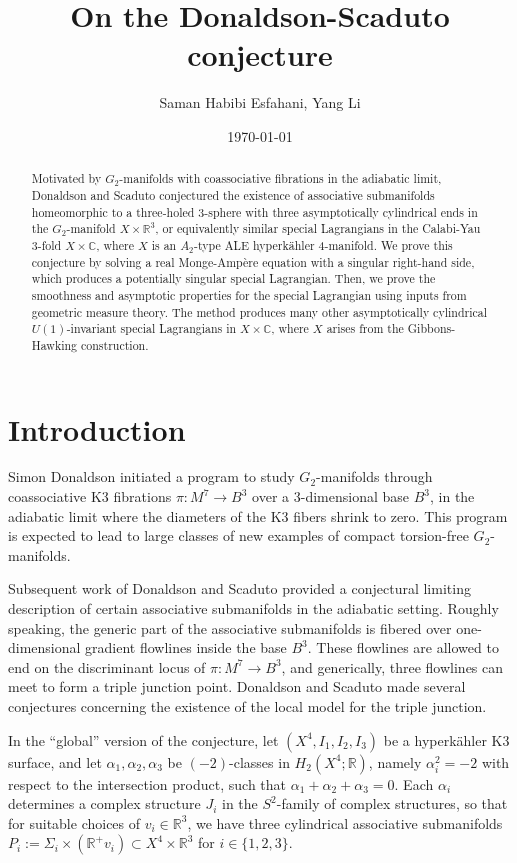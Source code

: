 \documentclass[11pt]{article}
\title{On the Donaldson-Scaduto conjecture}
\author{Saman Habibi Esfahani, Yang Li}
\date{\today}
\begin{document}
\maketitle

\begin{abstract}
Motivated by $G_2$-manifolds with coassociative fibrations in the adiabatic limit, Donaldson and Scaduto conjectured the existence of associative submanifolds homeomorphic to a three-holed $3$-sphere with three asymptotically cylindrical ends in the $G_2$-manifold $X \times \mathbb{R}^3$, or equivalently similar special Lagrangians in the Calabi-Yau 3-fold $X \times \mathbb{C}$, where $X$ is an $A_2$-type ALE hyperkähler 4-manifold. We prove this conjecture by solving a real Monge-Amp\`ere equation with a singular right-hand side, which produces a potentially singular special Lagrangian. Then, we prove the smoothness and asymptotic properties for the special Lagrangian using inputs from geometric measure theory. 
The method produces many other asymptotically cylindrical $U(1)$-invariant special Lagrangians in $X\times \mathbb{C}$, where $X$ arises from the Gibbons-Hawking construction.
\end{abstract}

\section{Introduction}

Simon Donaldson \cite{MR3702382} initiated a program to study $G_2$-manifolds through coassociative K3 fibrations $\pi:M^7\to B^3$ over a 3-dimensional base $B^3$, in the adiabatic limit where the diameters of the K3 fibers shrink to zero. This program is expected to lead to large classes of new examples of compact torsion-free $G_2$-manifolds. 

Subsequent work of Donaldson and Scaduto \cite{MR4479718}  provided a conjectural limiting description of certain associative submanifolds in the adiabatic setting. Roughly speaking, the generic part of the associative submanifolds is fibered over one-dimensional gradient flowlines inside the base $B^3$. These flowlines are allowed to end on the discriminant locus of $\pi: M^7\to B^3$, and generically, three flowlines can meet to form a triple junction point. Donaldson and Scaduto made several conjectures concerning the existence of the local model for the triple junction.

In the ``global'' version of the conjecture, let $(X^4, I_1, I_2, I_3)$ be a hyperkähler K3 surface, and let $\alpha_1, \alpha_2,\alpha_3$ be $(-2)$-classes in $H_2(X^4; \mathbb{R})$, namely $\alpha_i^2 = -2$ with respect to the intersection product, such that $\alpha_1 + \alpha_2 + \alpha_3 = 0$. Each $\alpha_i$ determines a complex structure $J_i$ in the $S^2$-family of complex structures, so that for suitable choices of $v_i\in \mathbb{R}^3$, 
we have three cylindrical associative submanifolds $P_i := \Sigma_i \times (\mathbb{R}^+ v_i) \subset X^4 \times \mathbb{R}^3$ for $i\in\{1,2,3\}$.
\end{document}
